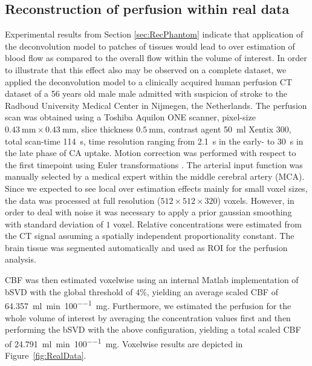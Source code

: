 \documentclass[journal,twocolumn]{IEEEtran}
\begin{document}
	
	\subsection{Reconstruction of perfusion within real data}\label{sec:RealData}
 	Experimental results from Section \ref{sec:RecPhantom} indicate that application of the deconvolution model to patches of tissues would lead to over estimation of blood flow as compared to the overall flow within the volume of interest.
	In order to illustrate that this effect also may be observed on a complete dataset, we applied the deconvolution model to a clinically acquired human perfusion CT dataset of a 56 years old male male admitted with suspicion of stroke to the Radboud University Medical Center in Nijmegen, the Netherlands.
	The perfusion scan was obtained using a Toshiba Aquilon ONE scanner, pixel-size $\SI{0.43}{\milli\meter}\times\SI{0.43}{\milli\meter}$, slice thickness $\SI{0.5}{\milli\meter}$, contrast agent \SI{50}{\milli\litre} Xentix 300, total scan-time \SI{114}{\second}, time resolution ranging from \SI{2.1}{\second} in the early- to \SI{30}{\second} in the late phase of CA uptake.
	Motion correction was performed with respect to the first timepoint using Euler transformations \cite{Manniesing16}.
	The arterial input function was manually selected by a medical expert within the middle cerebral artery (MCA).
	Since we expected to see local over estimation effects mainly for small voxel sizes, the data was processed at full resolution ($512\times512\times320$) voxels. 
	However, in order to deal with noise it was necessary to apply a prior gaussian smoothing with standard deviation of $1$ voxel.	
	Relative concentrations were estimated from the CT signal assuming a spatially independent proportionality constant. The brain tissue was segmented automatically and used as ROI for the perfusion analysis.

	CBF was then estimated voxelwise using an internal Matlab implementation of bSVD with the global threshold of $4\%$, yielding an average scaled CBF of \SI{64.357}{\milli\litre\per\minute\per100\milli\gram}.
	Furthermore, we estimated the perfusion for the whole volume of interest by averaging the concentration values first and then performing the bSVD with the above configuration, yielding a total scaled CBF of \SI{24.791}{\milli\litre\per\minute\per100\milli\gram}.
	Voxelwise results are depicted in Figure~\ref{fig:RealData}.
\end{document}

